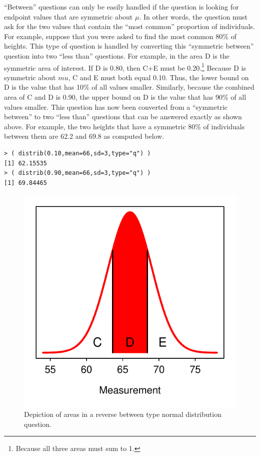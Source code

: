 \documentclass[10pt,openany]{book}\usepackage[]{graphicx}\usepackage[]{color}
\makeatletter
\newenvironment{kframe}{%
 \def\at@end@of@kframe{}%
 \ifinner\ifhmode%
  \def\at@end@of@kframe{\end{minipage}}%
  \begin{minipage}{\columnwidth}%
 \fi\fi%
 \def\FrameCommand##1{\hskip\@totalleftmargin \hskip-\fboxsep
 \colorbox{shadecolor}{##1}\hskip-\fboxsep
     \hskip-\linewidth \hskip-\@totalleftmargin \hskip\columnwidth}%
 \MakeFramed {\advance\hsize-\width
   \@totalleftmargin\z@ \linewidth\hsize
   \@setminipage}}%
 {\par\unskip\endMakeFramed%
 \at@end@of@kframe}
\newenvironment{knitrout}{}{} %
\makeatother
\begin{document}
``Between'' questions can only be easily handled if the question is looking for endpoint values that are symmetric about $\mu$.  In other words, the question must ask for the two values that contain the ``most common'' proportion of individuals.  For example, suppose that you were asked to find the most common 80\% of heights.  This type of question is handled by converting this ``symmetric between'' question into two ``less than'' questions.  For example, in  the area D is the symmetric area of interest.  If D is 0.80, then C+E must be 0.20.\footnote{Because all three areas must sum to 1.}  Because D is symmetric about $mu$, C and E must both equal 0.10.  Thus, the lower bound on D is the value that has 10\% of all values smaller.  Similarly, because the combined area of C and D is 0.90, the upper bound on D is the value that has 90\% of all values smaller.  This question has now been converted from a ``symmetric between'' to two ``less than'' questions that can be answered exactly as shown above.  For example, the two heights that have a symmetric 80\% of individuals between them are 62.2 and 69.8 as computed below.
\begin{knitrout}
\color{fgcolor}\begin{kframe}
\begin{verbatim}
> ( distrib(0.10,mean=66,sd=3,type="q") )
[1] 62.15535
> ( distrib(0.90,mean=66,sd=3,type="q") )
[1] 69.84465
\end{verbatim}
\end{kframe}
\end{knitrout}

\begin{knitrout}
\color{fgcolor}\begin{figure}[hbtp]

{\centering \includegraphics[width=.4\linewidth]{Figs/NormRevBetween-1} 

}

\caption[Depiction of areas in a reverse between type normal distribution question]{Depiction of areas in a reverse between type normal distribution question.}\label{fig:NormRevBetween}
\end{figure}


\end{knitrout}
\end{document}
